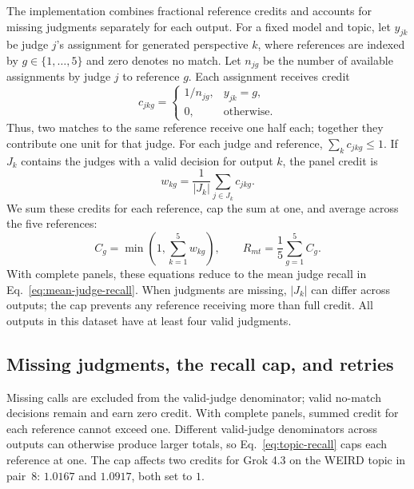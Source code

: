 \documentclass[11pt,a4paper]{article}
\begin{document}
The implementation combines fractional reference credits and accounts for missing judgments separately for each output. For a fixed model and topic, let $y_{jk}$ be judge $j$'s assignment for generated perspective $k$, where references are indexed by $g\in\{1,\ldots,5\}$ and zero denotes no match. Let $n_{jg}$ be the number of available assignments by judge $j$ to reference $g$. Each assignment receives credit
\begin{equation}
c_{jkg}=\begin{cases}
1/n_{jg}, & y_{jk}=g,\\
0, & \text{otherwise}.
\end{cases}
\label{eq:split-credit}
\end{equation}
Thus, two matches to the same reference receive one half each; together they contribute one unit for that judge. For each judge and reference, $\sum_k c_{jkg}\leq 1$. If $J_k$ contains the judges with a valid decision for output $k$, the panel credit is
\begin{equation}
w_{kg}=\frac{1}{|J_k|}\sum_{j\in J_k}c_{jkg}.
\label{eq:panel-credit}
\end{equation}
We sum these credits for each reference, cap the sum at one, and average across the five references:
\begin{equation}
C_g=\min\!\left(1,\sum_{k=1}^{5}w_{kg}\right),
\qquad
R_{mt}=\frac{1}{5}\sum_{g=1}^{5}C_g.
\label{eq:topic-recall}
\end{equation}
With complete panels, these equations reduce to the mean judge recall in Eq.~\ref{eq:mean-judge-recall}. When judgments are missing, $|J_k|$ can differ across outputs; the cap prevents any reference receiving more than full credit. All outputs in this dataset have at least four valid judgments.

\subsection{Missing judgments, the recall cap, and retries}
\label{app:missing_judgments}
\label{app:judgment_counts}
Missing calls are excluded from the valid-judge denominator; valid no-match decisions remain and earn zero credit. With complete panels, summed credit for each reference cannot exceed one. Different valid-judge denominators across outputs can otherwise produce larger totals, so Eq.~\ref{eq:topic-recall} caps each reference at one. The cap affects two credits for Grok 4.3 on the WEIRD topic in pair~8: $1.0167$ and $1.0917$, both set to $1$.
\end{document}
